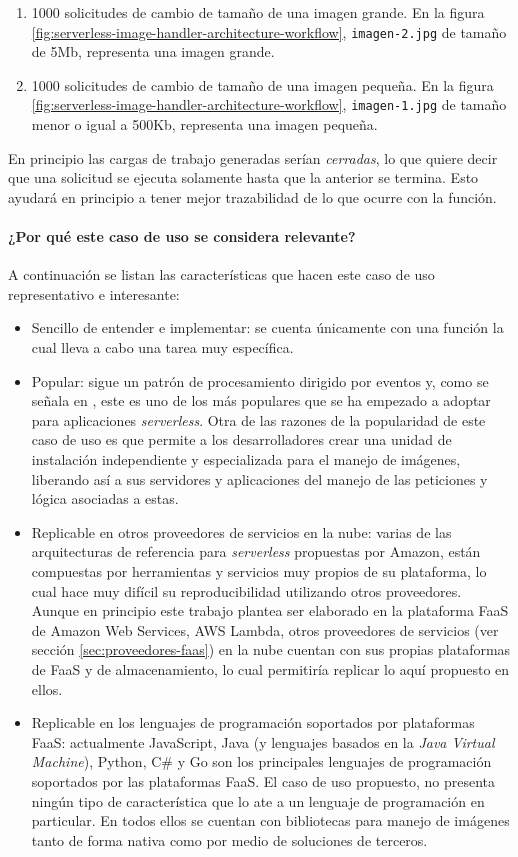 \begin{enumerate}
    \item 1000 solicitudes de cambio de tamaño de una imagen grande. En la figura \ref{fig:serverless-image-handler-architecture-workflow}, \texttt{imagen-2.jpg} de tamaño de 5Mb, representa una imagen grande.
    \item 1000 solicitudes de cambio de tamaño de una imagen pequeña. En la figura \ref{fig:serverless-image-handler-architecture-workflow}, \texttt{imagen-1.jpg} de tamaño menor o igual a 500Kb, representa una imagen pequeña.
\end{enumerate}

En principio las cargas de trabajo generadas serían \emph{cerradas}, lo que quiere decir que una solicitud se ejecuta solamente hasta que la anterior se termina. Esto ayudará en principio a tener mejor trazabilidad de lo que ocurre con la función.

\paragraph{¿Por qué este caso de uso se considera relevante?}
A continuación se listan las características que hacen este caso de uso representativo e interesante:
\begin{itemize}
    \item Sencillo de entender e implementar: se cuenta únicamente con una función la cual lleva a cabo una tarea muy específica.
    \item Popular: sigue un patrón de procesamiento dirigido por eventos y, como se señala en \cite{serverless-architecture-patterns}, este es uno de los más populares que se ha empezado a adoptar para aplicaciones \emph{serverless}. Otra de las razones de la popularidad de este caso de uso es que permite a los desarrolladores crear una unidad de instalación independiente y especializada para el manejo de imágenes, liberando así a sus servidores y aplicaciones del manejo de las peticiones y lógica asociadas a estas.
    \item Replicable en otros proveedores de servicios en la nube: varias de las arquitecturas de referencia para \emph{serverless} propuestas por Amazon, están compuestas por herramientas y servicios muy propios de su plataforma, lo cual hace muy difícil su reproducibilidad utilizando otros proveedores. Aunque en principio este trabajo plantea ser elaborado en la plataforma FaaS de Amazon Web Services, AWS Lambda, otros proveedores de servicios (ver sección \ref{sec:proveedores-faas}) en la nube cuentan con sus propias plataformas de FaaS y de almacenamiento, lo cual permitiría replicar lo aquí propuesto en ellos.
    \item Replicable en los lenguajes de programación soportados por plataformas FaaS: actualmente JavaScript, Java (y lenguajes basados en la \emph{Java Virtual Machine}), Python, C\# y Go son los principales lenguajes de programación soportados por las plataformas FaaS. El caso de uso propuesto, no presenta ningún tipo de característica que lo ate a un lenguaje de programación en particular. En todos ellos se cuentan con bibliotecas para manejo de imágenes tanto de forma nativa como por medio de soluciones de terceros. 
\end{itemize}

